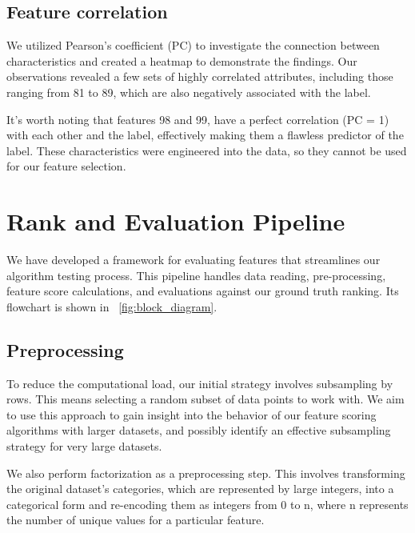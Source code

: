\documentclass[fleqn,moreauthors,10pt]{ds_report}
\begin{document}
\subsection*{Feature correlation}
We utilized Pearson's coefficient (PC) to investigate the connection between characteristics and created a heatmap to demonstrate the findings. Our observations revealed a few sets of highly correlated attributes, including those ranging from 81 to 89, which are also negatively associated with the label.

It's worth noting that features 98 and 99, have a perfect correlation (PC = 1) with each other and the label, effectively making them a flawless predictor of the label. These characteristics were engineered into the data, so they cannot be used for our feature selection.

\section*{Rank and Evaluation Pipeline}

We have developed a framework for evaluating features that streamlines our algorithm testing process. This pipeline handles data reading, pre-processing, feature score calculations, and evaluations against our ground truth ranking. Its flowchart is shown in \figurename~\ref{fig:block_diagram}.


\subsection*{Preprocessing}
To reduce the computational load, our initial strategy involves subsampling by rows. This means selecting a random subset of data points to work with. We aim to use this approach to gain insight into the behavior of our feature scoring algorithms with larger datasets, and possibly identify an effective subsampling strategy for very large datasets. 

We also perform factorization as a preprocessing step. This involves transforming the original dataset's categories, which are represented by large integers, into a categorical form and re-encoding them as integers from 0 to n, where n represents the number of unique values for a particular feature.
\end{document}

